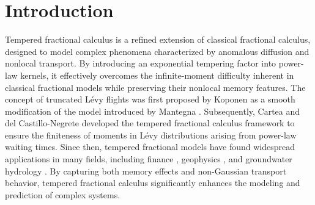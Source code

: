 \documentclass[10pt, reqno]{amsart}
\theoremstyle{remark}
\theoremstyle{definition}
\numberwithin{table}{section}
\begin{document}
\section{Introduction}
Tempered fractional calculus is a refined extension of classical fractional calculus, designed to model complex phenomena characterized by anomalous diffusion and nonlocal transport. By introducing an exponential tempering factor into power-law kernels, it effectively overcomes the infinite-moment difficulty inherent in classical fractional models while preserving their nonlocal memory features. The concept of truncated Lévy flights was first proposed by Koponen \cite{koponen1995} as a smooth modification of the model introduced by Mantegna \cite{mantegna1994}. Subsequently, Cartea and del Castillo-Negrete \cite{cartea2007} developed the tempered fractional calculus framework to ensure the finiteness of moments in Lévy distributions arising from power-law waiting times. Since then, tempered fractional models have found widespread applications in many fields, including finance \cite{carr2002, carr2003, zhou2024}, geophysics \cite{meerschaert2008, xia2013, zhang2011, zhang2012}, and groundwater hydrology \cite{zhang2014}. By capturing both memory effects and non-Gaussian transport behavior, tempered fractional calculus significantly enhances the modeling and prediction of complex systems.
\end{document}
